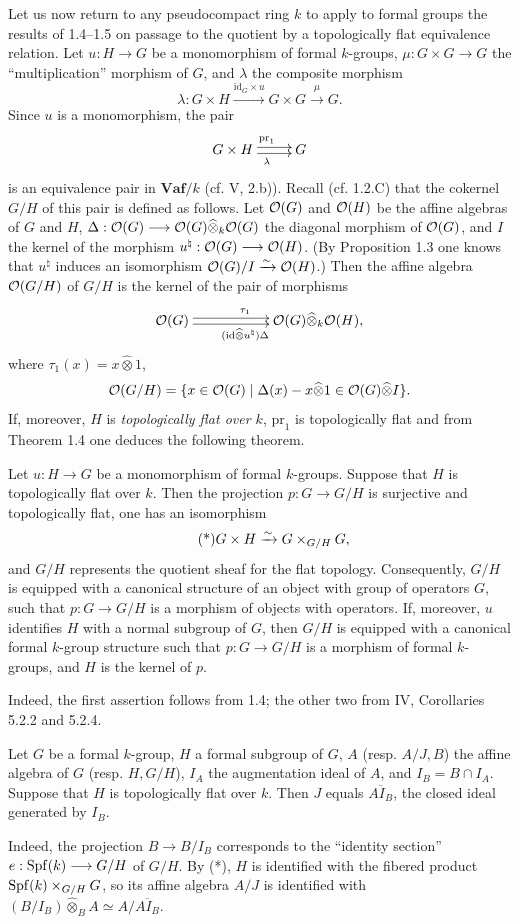 Let us now return to any pseudocompact ring $k$ to apply to formal groups the results of 1.4--1.5 on passage to the quotient by a topologically flat equivalence relation.
Let $u:H\to G$ be a monomorphism of formal $k$-groups, $\mu:G\times G\to G$ the ``multiplication'' morphism of $G$, and $\lambda$ the composite morphism
\[
\lambda:G\times H\xrightarrow{\mathrm{id}_G\times u}G\times G\xrightarrow{\mu}G.
\]
Since $u$ is a monomorphism, the pair
\[
\xymatrix{G\times H\ar@<.5ex>[r]^{\mathrm{pr}_1}\ar@<-.5ex>[r]_\lambda&G}
\]
is an equivalence pair in $\mathbf{Vaf}/k$ (cf. V, 2.b)). Recall (cf. 1.2.C) that the cokernel $G/H$ of this pair is defined as follows.
Let $\mathcal{O}(G)$ and $\mathcal{O}(H)$ be the affine algebras of $G$ and $H$, $\Delta:\mathcal{O}(G)\longrightarrow\mathcal{O}(G)\widehat\otimes_k\mathcal{O}(G)$ the diagonal morphism of $\mathcal{O}(G)$, and $I$ the kernel of the morphism $u^\natural:\mathcal{O}(G)\longrightarrow\mathcal{O}(H)$. (By Proposition 1.3 one knows that $u^\natural$ induces an isomorphism $\mathcal{O}(G)/I\xrightarrow{\sim}\mathcal{O}(H)$.) Then the affine algebra $\mathcal{O}(G/H)$ of $G/H$ is the kernel of the pair of morphisms
\[
\xymatrix@C=54pt{\OO(G)\ar@<.5ex>[r]^{\tau_1}\ar@<-.5ex>[r]_{(\mathrm{id}\widehat\otimes u^\natural)\Delta}&\OO(G)\widehat\otimes_k\OO(H),}
\]
where $\tau_1(x)=x\widehat\otimes1$, \ie
\[
\mathcal{O}(G/H)=\{x\in\mathcal{O}(G)\mid\Delta(x)-x\widehat\otimes1\in\mathcal{O}(G)\widehat\otimes I\}.
\]
If, moreover, $H$ is \emph{topologically flat over $k$}, $\mathrm{pr}_1$ is topologically flat and from Theorem 1.4 one deduces the following theorem.
\begin{theorem}{}
Let $u:H\to G$ be a monomorphism of formal $k$-groups. Suppose that $H$ is topologically flat over $k$. Then the projection $p:G\to G/H$ is surjective and topologically flat, one has an isomorphism
\begin{equation}\tag{*}
G\times H\xrightarrow{\sim} G\times_{G/H}G,
\end{equation}
and $G/H$ represents the quotient sheaf for the flat topology.
Consequently, $G/H$ is equipped with a canonical structure of an object with group of operators $G$, such that $p:G\to G/H$ is a morphism of objects with operators. If, moreover, $u$ identifies $H$ with a normal subgroup of $G$, then $G/H$ is equipped with a canonical formal $k$-group structure such that $p:G\to G/H$ is a morphism of formal $k$-groups, and $H$ is the kernel of $p$.
\end{theorem}
Indeed, the first assertion follows from 1.4; the other two from IV, Corollaries 5.2.2 and 5.2.4.
\begin{corollary}{}
Let $G$ be a formal $k$-group, $H$ a formal subgroup of $G$, $A$ (resp. $A/J,B$) the affine algebra of $G$ (resp. $H,G/H$), $I_A$ the augmentation ideal of $A$, and $I_B=B\cap I_A$. Suppose that $H$ is topologically flat over $k$. Then $J$ equals $\overline{AI_B}$, the closed ideal generated by $I_B$.
\end{corollary}
Indeed, the projection $B\to B/I_B$ corresponds to the ``identity section'' $e:\operatorname{Spf}(k)\longrightarrow G/H$ of $G/H$. By (*), $H$ is identified with the fibered product $\operatorname{Spf}(k)\times_{G/H}G$, so its affine algebra $A/J$ is identified with $(B/I_B)\widehat\otimes_B A\simeq A/\overline{AI_B}$.

